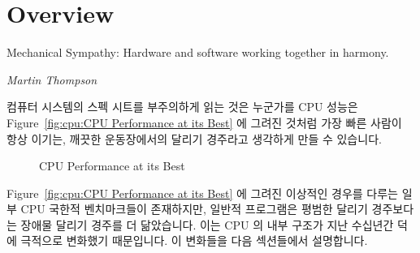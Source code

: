 
\section{Overview}
\label{sec:cpu:Overview}
%
\epigraph{Mechanical Sympathy: Hardware and software working together in
	  harmony.}{\emph{Martin Thompson}}

컴퓨터 시스템의 스펙 시트를 부주의하게 읽는 것은 누군가를 CPU 성능은
Figure~\ref{fig:cpu:CPU Performance at its Best} 에 그려진 것처럼 가장 빠른
사람이 항상 이기는, 깨끗한 운동장에서의 달리기 경주라고 생각하게 만들 수
있습니다.

\begin{figure}[htb]
\centering
{}
\caption{CPU Performance at its Best}
\end{figure}

Figure~\ref{fig:cpu:CPU Performance at its Best} 에 그려진 이상적인 경우를
다루는 일부 CPU 국한적 벤치마크들이 존재하지만, 일반적 프로그램은 평범한 달리기
경주보다는 장애물 달리기 경주를 더 닮았습니다.
이는 CPU 의 내부 구조가 지난 수십년간  덕에 극적으로 변화했기
때문입니다.
이 변화들을 다음 섹션들에서 설명합니다.

